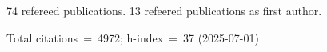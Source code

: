 74 refereed publications. 13 refeered publications as first author.

Total citations~=~4972; h-index~=~37 (2025-07-01)